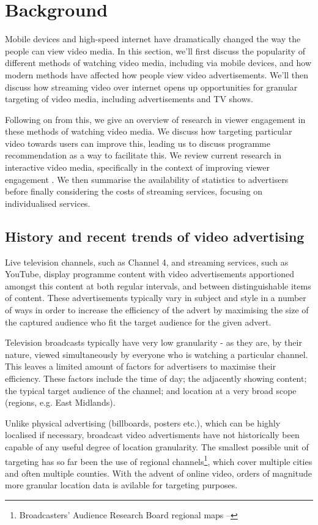 \section{Background}

Mobile devices and high-speed internet have dramatically changed the way the people can view video media. In this section, we'll first discuss the popularity of different methods of watching video media, including via mobile devices, and how modern methods have affected how people view video advertisements. We'll then discuss how streaming video over internet opens up opportunities for granular targeting of video media, including advertisements and TV shows. 

Following on from this, we give an overview of research in viewer engagement in these methods of watching video media. We discuss how targeting particular video towards users can improve this, leading us to discuss programme recommendation as a way to facilitate this. We review current research in interactive video media, specifically in the context of improving viewer engagement \cite{what_is_engagement}. We then summarise the availability of statistics to advertisers before finally considering the costs of streaming services, focusing on individualised services.

\subsection{History and recent trends of video advertising}

	Live television channels, such as Channel 4, and streaming services, such as YouTube, display programme content with video advertisements apportioned amongst this content at both regular intervals, and between distinguishable items of content. These advertisements typically vary in subject and style in a number of ways in order to increase the efficiency of the advert by maximising the size of the captured audience who fit the target audience for the given advert.

	Television broadcasts typically have very low granularity - as they are, by their nature, viewed simultaneously by everyone who is watching a particular channel. This leaves a limited amount of factors for advertisers to maximise their efficiency. These factors include the time of day; the adjacently showing content; the typical target audience of the channel; and location at a very broad scope (regions, e.g. East Midlands).

	Unlike physical advertising (billboards, posters etc.), which can be highly localised if necessary, broadcast video advertisments have not historically been capable of any useful degree of location granularity. The smallest possible unit of targeting has so far been the use of regional channels\footnote{Broadcasters' Audience Research Board regional maps -- }, which cover multiple cities and often multiple counties. With the advent of online video, orders of magnitude more granular location data is avilable for targeting purposes.

